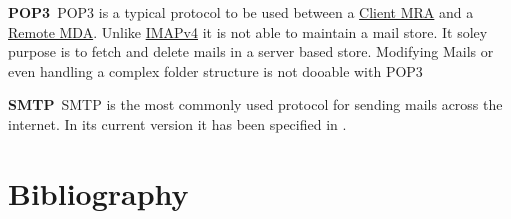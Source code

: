 \documentclass[10pt,a4paper]{book}
\newenvironment{entry}{\par\leavevmode\hangpara{1.5mm}{1}\ignorespaces}{\RaggedRight\par}
\newcommand*{\mainentry}[2]{{\bfseries{#1\label{def:#1}}}~#2\par}
\newcommand*{\defref}[1]{\hyperref[def:#1]{#1}}
\begin{document}
\begin{appendices}
\begin{entry}
  \mainentry{POP3}{POP3 is a typical protocol to be used between a \defref{Client MRA} and a \defref{Remote MDA}. Unlike \defref{IMAPv4} it is not able to maintain a mail store. It soley purpose is to fetch and delete mails in a server based store. Modifying Mails or even handling a complex folder structure is not dooable with POP3}
\end{entry}

\begin{entry}
  \mainentry{SMTP}{SMTP is the most commonly used protocol for sending mails across the internet. In its current version it has been specified in \cite{RFC5321}.}
\end{entry}

\chapter{Bibliography}
\printbibliography[title={},heading=none]

\printindex

\begin{comment}

\end{comment}

\end{appendices}

\begin{comment}
http://www.rfc-editor.org/pubprocess.html
RFC2223 Instructions to RFC Authors
RFC2119 BCP14 Key words for use in RFCs to Indicate Requirement Levels
RFC3979 BCP79 Intellectual Property Rights in IETF Technology
RFC5378 BCP78 Rights Contributors Provide to the IETF Trust


http://tex.stackexchange.com/questions/36307/formatting-back-references-in-bibliography
http://www.cs.columbia.edu/irt/software/l2x/ l2x -- conversion from LaTeX to other formats Version 1.13
http://ftp.gwdg.de/pub/ctan/support/l2x/
http://tools.ietf.org/tools/xml2rfc2

http://www.zisc.ethz.ch/events/2003-2011/ISC2006Slides/FederrathZISCTalk.pdf

Professorliste
Dr. Christoph Sprenger (Part I)
-Prof. David Basin
Gregory Demay
Peter Gazi
Dr. Srdjan Marinovic
Dr. Sasa Radomirovic
Dr. Ralf Sasse

T. Hoefler
A. Perrig 
-Dr. Jan Camenisch (Keine Berechtigung)

-Srdjan Capkun (Keine Kapazität)
-David Basin  (Keine Kapazität)
\end{comment}
\end{document}
